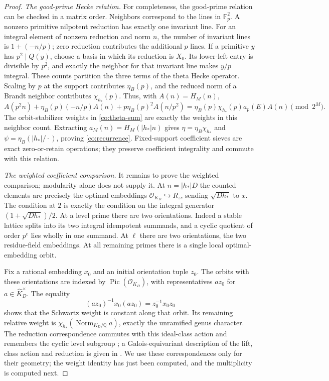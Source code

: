 \begin{proof}
\par\smallskip\noindent\emph{The good-prime Hecke relation.}
For completeness, the good-prime relation can be checked in a matrix
order.  Neighbors correspond to the lines in $\mathbb F_p^2$.
A nonzero primitive nilpotent reduction has exactly one invariant
line.  For an integral element of nonzero reduction and norm $n$,
the number of invariant lines is $1+(-n/p)$; zero reduction contributes
the additional $p$ lines.  If a primitive $y$ has $p^2\mid Q(y)$,
choose a basis in which its reduction is $X_0$.  Its lower-left entry
is divisible by $p^2$, and exactly the neighbor for that invariant
line makes $y/p$ integral.  These counts partition the three terms
of the theta Hecke operator.  Scaling by $p$ at the support contributes
$\eta_B(p)$, and the reduced norm of a Brandt neighbor contributes
$\chi_{h_*}(p)$.  Thus, with $A(n)=H_M(n)$,
\[
 A(p^2n)+\eta_B(p)(-n/p)A(n)+p\eta_B(p)^2A(n/p^2)
       =\eta_B(p)\chi_{h_*}(p)a_p(E)A(n)\pmod {2^M}.
\]
The orbit-stabilizer weights in \eqref{co:theta-sum} are exactly the
weights in this neighbor count.  Extracting
$a_M(n)=H_M(|h_*|n)$ gives
$\eta=\eta_B\chi_{h_*}$ and
$\psi=\eta_B(|h_*|/\cdot)$, proving \eqref{co:recurrence}.
Fixed-support coefficient sieves are exact zero-or-retain operations;
they preserve coefficient integrality and commute with this relation.

\par\smallskip\noindent\emph{The weighted coefficient comparison.}
It remains to prove the weighted comparison; modularity alone does
not supply it.  At $n=|h_*|D$ the counted elements are precisely the
optimal embeddings $\mathcal O_{K_D}\hookrightarrow R_z$, sending
$\sqrt{Dh_*}$ to $x$.  The condition at $2$ is exactly the condition
on the integral generator $(1+\sqrt{Dh_*})/2$.
At a level prime there are two orientations.  Indeed a stable lattice
splits into its two integral idempotent summands, and a cyclic quotient
of order $p^e$ lies wholly in one summand.  At $\ell$ there are two
orientations, the two residue-field embeddings.  At all remaining
primes there is a single local optimal-embedding orbit.

Fix a rational embedding $x_0$ and an initial orientation tuple $z_0$.
The orbits with these orientations are indexed by
$\operatorname{Pic}(\mathcal O_{K_D})$, with representatives $az_0$
for $a\in\widehat K_D^\times$.  The equality
\[
 (az_0)^{-1}x_0(az_0)=z_0^{-1}x_0z_0
\]
shows that the Schwartz weight is constant along that orbit.  Its
remaining relative weight is
$\chi_{h_*}(\operatorname{Norm}_{K_D/\mathbb Q}a)$, exactly the
unramified genus character.  The reduction correspondence commutes
with this ideal-class action and remembers the cyclic level subgroup
\cite[\S2]{JetchevKane2010}; a Galois-equivariant description of the
lift, class action and reduction is given in
\cite[\S3.2, \S\S4.6, 4.9--4.10 and Corollary~4.1]{CornutJetchev2013}.
We use these correspondences only for their geometry; the weight
identity has just been computed, and the multiplicity is computed next.


\end{proof}
